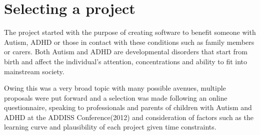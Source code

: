 \documentclass[11pt]{report}
\begin{document}
\section{Selecting a project}
The project started with the purpose of creating software to benefit someone with Autism, ADHD or those in contact with these conditions such as family members or carers. Both Autism and ADHD are developmental disorders that start from birth and affect the individual's attention, concentrations and ability to fit into mainstream society.

Owing this was a very broad topic with many possible avenues, multiple proposals were put forward and a selection was made following an online questionnaire, speaking to professionals and parents of children with Autism and ADHD at the ADDISS Conference(2012) and consideration of factors such as the learning curve and plausibility of each project given time constraints.
\end{document}
